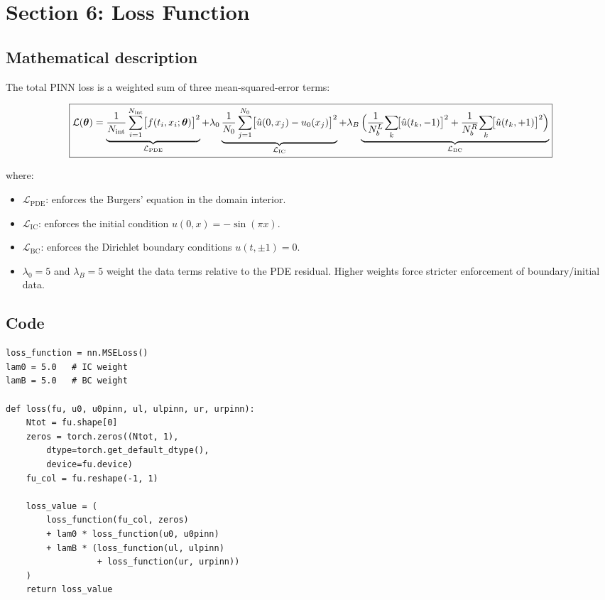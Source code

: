 \documentclass[11pt,a4paper]{article}
\begin{document}
\section{Section 6: Loss Function}
\label{sec:loss}

\subsection*{Mathematical description}

The total PINN loss is a weighted sum of three mean-squared-error terms:

\begin{equation}
\boxed{
  \mathcal{L}(\bm\theta)
  = \underbrace{
      \frac{1}{N_{\mathrm{int}}} \sum_{i=1}^{N_{\mathrm{int}}}
      \bigl[f(t_i, x_i;\bm\theta)\bigr]^2
    }_{\mathcal{L}_{\mathrm{PDE}}}
  + \lambda_0
    \underbrace{
      \frac{1}{N_0} \sum_{j=1}^{N_0}
      \bigl[\hat{u}(0, x_j) - u_0(x_j)\bigr]^2
    }_{\mathcal{L}_{\mathrm{IC}}}
  + \lambda_B
    \underbrace{
      \Bigl(
        \frac{1}{N_b^L}\!\sum_k\!\bigl[\hat{u}(t_k, -1)\bigr]^2
        + \frac{1}{N_b^R}\!\sum_k\!\bigl[\hat{u}(t_k, +1)\bigr]^2
      \Bigr)
    }_{\mathcal{L}_{\mathrm{BC}}}
}
\label{eq:loss}
\end{equation}

where:
\begin{itemize}[nosep]
  \item $\mathcal{L}_{\mathrm{PDE}}$: enforces the Burgers' equation in
        the domain interior.
  \item $\mathcal{L}_{\mathrm{IC}}$: enforces the initial condition
        $u(0,x) = -\sin(\pi x)$.
  \item $\mathcal{L}_{\mathrm{BC}}$: enforces the Dirichlet boundary
        conditions $u(t,\pm 1) = 0$.
  \item $\lambda_0 = 5$ and $\lambda_B = 5$ weight the data terms
        relative to the PDE residual.  Higher weights force stricter
        enforcement of boundary/initial data.
\end{itemize}

\subsection*{Code}

\begin{lstlisting}
loss_function = nn.MSELoss()
lam0 = 5.0   # IC weight
lamB = 5.0   # BC weight

def loss(fu, u0, u0pinn, ul, ulpinn, ur, urpinn):
    Ntot = fu.shape[0]
    zeros = torch.zeros((Ntot, 1),
        dtype=torch.get_default_dtype(),
        device=fu.device)
    fu_col = fu.reshape(-1, 1)

    loss_value = (
        loss_function(fu_col, zeros)
        + lam0 * loss_function(u0, u0pinn)
        + lamB * (loss_function(ul, ulpinn)
                  + loss_function(ur, urpinn))
    )
    return loss_value
\end{lstlisting}
\end{document}
